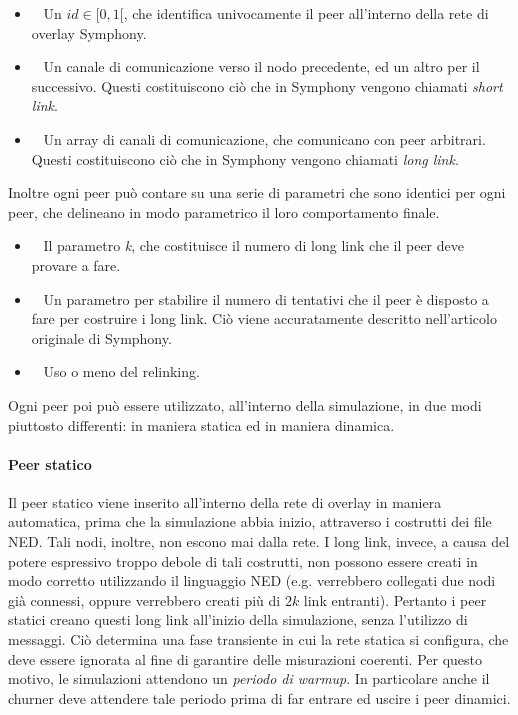 \documentclass[prodmode,acmtap]{acmlarge}
\begin{document}
\begin{itemize}
	\item ~ Un $id \in [0,1[$, che identifica univocamente il peer all'interno della rete di overlay Symphony. 
	\item ~ Un canale di comunicazione verso il nodo precedente, ed un altro per il successivo. Questi costituiscono ciò che in Symphony vengono chiamati \textit{short link}.
	\item ~ Un array di canali di comunicazione, che comunicano con peer arbitrari. Questi costituiscono ciò che in Symphony vengono chiamati \textit{long link}.
\end{itemize}

Inoltre ogni peer può contare su una serie di parametri che sono identici per ogni peer, che delineano in modo parametrico il loro comportamento finale.

\begin{itemize}
	\item ~ Il parametro \textit{k}, che costituisce il numero di long link che il peer deve provare a fare.
	\item ~ Un parametro per stabilire il numero di tentativi che il peer è disposto a fare per costruire i long link. Ciò viene accuratamente descritto nell'articolo originale di Symphony.
	\item ~ Uso o meno del relinking.
\end{itemize}

Ogni peer poi può essere utilizzato, all'interno della simulazione, in due modi piuttosto differenti: in maniera statica ed in maniera dinamica. 

\paragraph{Peer statico}
Il peer statico viene inserito all'interno della rete di overlay in maniera automatica, prima che la simulazione abbia inizio, attraverso i costrutti dei file NED. Tali nodi, inoltre, non escono mai dalla rete. I long link, invece, a causa del potere espressivo troppo debole di tali costrutti, non possono essere creati in modo corretto utilizzando il linguaggio NED (e.g. verrebbero collegati due nodi già connessi, oppure verrebbero creati più di $2k$ link entranti). Pertanto i peer statici creano questi long link all'inizio della simulazione, senza l'utilizzo di messaggi. Ciò determina una fase transiente in cui la rete statica si configura, che deve essere ignorata al fine di garantire delle misurazioni coerenti. Per questo motivo, le simulazioni attendono un \textit{periodo di warmup}. In particolare anche il churner deve attendere tale periodo prima di far entrare ed uscire i peer dinamici.
\end{document}

